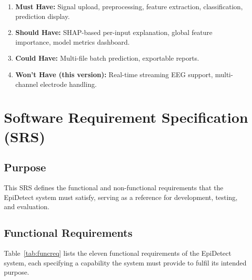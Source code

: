 \begin{enumerate}
    \item \textbf{Must Have:} Signal upload, preprocessing, feature extraction, classification, prediction display.
    \item \textbf{Should Have:} SHAP-based per-input explanation, global feature importance, model metrics dashboard.
    \item \textbf{Could Have:} Multi-file batch prediction, exportable reports.
    \item \textbf{Won't Have (this version):} Real-time streaming EEG support, multi-channel electrode handling.
\end{enumerate}

\section{Software Requirement Specification (SRS)}

\subsection{Purpose}
This SRS defines the functional and non-functional requirements that the EpiDetect system must satisfy, serving as a reference for development, testing, and evaluation.

\subsection{Functional Requirements}

Table~\ref{tab:funcreq} lists the eleven functional requirements of the EpiDetect system, each specifying a capability the system must provide to fulfil its intended purpose.

